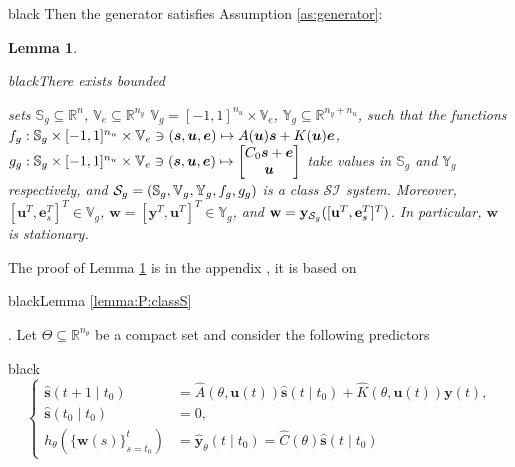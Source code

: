 \documentclass{ifacconf}
\def\eqref#1{(\ref{#1})}
\def\rve{{\mathbf{e}}}
\def\rvu{{\mathbf{i}}}
\def\rvs{{\mathbf{s}}}
\def\rvu{{\mathbf{u}}}
\def\rvw{{\mathbf{w}}}
\def\rvy{{\mathbf{y}}}
\def\ve{{\bm{e}}}
\def\vs{{\bm{s}}}
\def\vu{{\bm{u}}}
\def\vv{{\bm{v}}}
\newtheorem{lemma}{Lemma}[section]
\newcommand{\class}{\(\mathcal{SI}\)}
\begin{document}
\begin{color}{black}
 Then the generator satisfies Assumption \ref{as:generator}:
\end{color}
 \begin{lemma}
  \label{ge:systemS:bilinear}
   \begin{color}{black}There exists bounded\end{color} sets $\mathbb{S}_g \subseteq \mathbb{R}^{n}$, $\mathbb{V}_e \subseteq \mathbb{R}^{n_y}$
   $\mathbb{V}_g=[-1,1]^{n_u} \times \mathbb{V}_e$, $\mathbb{Y}_g \subseteq \mathbb{R}^{n_y+n_u}$, 
   such that the functions $f_g: \mathbb{S}_g \times [-1,1]^{n_u} \times \mathbb{V}_e \ni {\color{black}(\vs,\vu,\ve)} \mapsto A(\vu)\vs+K(\vu)\ve$, 
   ${\color{black}g_g}: \mathbb{S}_g \times [-1,1]^{n_u} \times \mathbb{V}_e \ni (\vs,\vu,\ve) \mapsto \begin{bmatrix} C_0\vs+\ve \\ \vu \end{bmatrix}$ take values in $\mathbb{S}_g$ and $\mathbb{Y}_g$ respectively, 
   and $\mathcal{S}_g=(\mathbb{S}_g,\mathbb{V}_g,\mathbb{Y}_g,f_g,{\color{black}g_g})$ is a class \class{} system.
   Moreover, $[\rvu^T,\rve_s^T]^T \in \mathbb{V}_g$, $\rvw=[\rvy^T, \rvu^T]^T \in \mathbb{Y}_g$,
   and $\rvw={\color{black}\rvy_{\mathcal{S}_g}([\rvu^T,\rve_s^T]^T)}$. In particular, $\rvw$ is stationary.
 \end{lemma}
 The proof of Lemma \ref{ge:systemS:bilinear} is in the appendix%
 , it is based on 
 \begin{color}{black}Lemma \ref{lemma:P:classS}\end{color}.
Let $\Theta \subseteq \mathbb{R}^{n_{\theta}}$ be a compact set and consider the following predictors
\begin{color}{black}
\begin{equation}
\label{pred:bilinear}
\left\{
\begin{aligned}
\hat{\rvs}(t+1 \mid t_0) &=  \hat{A}(\theta, \rvu(t))\hat{\rvs}(t \mid t_0)+ \hat{K}(\theta,\rvu(t))\rvy(t), \\
\hat{\rvs}(t_0 \mid t_0)&=0, \\
h_{\theta}(\{\rvw(s)\}_{s=t_0}^{t})&=\hat{\rvy}_{\theta}(t \mid t_0) = \hat{C}(\theta)\hat{\rvs}(t \mid t_0)
\end{aligned}
\right.
\end{equation}
\end{color}
\end{document}
